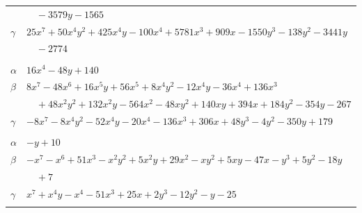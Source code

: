 \documentclass[11pt]{article}
\begin{document}
\begin{longtable}{@{}ll@{}}
 & $\quad -3579y-1565$\\
$\gamma$ & $25x^{7}+50x^{4}y^{2}+425x^{4}y-100x^{4}+5781x^{3}+909x-1550y^{3}-138y^{2}-3441y$\\
 & $\quad -2774$\\
\addlinespace[3pt]
\multicolumn{2}{@{}l}{$\{i,j\}=\{24,26\}$, $k_{ij}=3^{3}\cdot 17$}\\
$\alpha$ & $16x^{4}-48y+140$\\
$\beta$ & $8x^{7}-48x^{6}+16x^{5}y+56x^{5}+8x^{4}y^{2}-12x^{4}y-36x^{4}+136x^{3}$\\
 & $\quad +48x^{2}y^{2}+132x^{2}y-564x^{2}-48xy^{2}+140xy+394x+184y^{2}-354y-267$\\
$\gamma$ & $-8x^{7}-8x^{4}y^{2}-52x^{4}y-20x^{4}-136x^{3}+306x+48y^{3}-4y^{2}-350y+179$\\
\addlinespace[3pt]
\multicolumn{2}{@{}l}{$\{i,j\}=\{25,27\}$, $k_{ij}=3^{2}\cdot 7$}\\
$\alpha$ & $-y+10$\\
$\beta$ & $-x^{7}-x^{6}+51x^{3}-x^{2}y^{2}+5x^{2}y+29x^{2}-xy^{2}+5xy-47x-y^{3}+5y^{2}-18y$\\
 & $\quad +7$\\
$\gamma$ & $x^{7}+x^{4}y-x^{4}-51x^{3}+25x+2y^{3}-12y^{2}-y-25$\\
\addlinespace[3pt]
\end{longtable}
\endgroup
\end{document}
